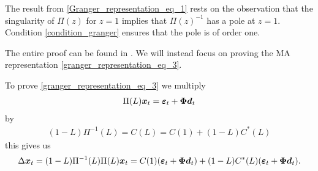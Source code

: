 \begin{bema}
    The result from \eqref{Granger_representation_eq_1} rests on the observation that the singularity of $\Pi(z)$ for $z=1$ implies that $\Pi(z)^{-1}$ has a pole at $z=1$. Condition \ref{condition_granger} ensures that the pole is of order one.
\end{bema}
\noindent The entire proof can be found in \cite{co-Integration_and_error_correction}. We will instead focus on proving the MA representation \eqref{granger_representation_eq_3}.
\begin{bevis}
    To prove \eqref{granger_representation_eq_3} we multiply 
    \begin{align*}
        \Pi(L)\boldsymbol{x}_t=\boldsymbol{\varepsilon}_t + \boldsymbol{\Phi} \boldsymbol{d}_t
    \end{align*}
    by
    \begin{align*}
        (1-L)\Pi^{-1}(L)=C(L)=C(1)+(1-L)C^\ast(L)
    \end{align*}
    this gives us
    \begin{align*}
        \Delta \boldsymbol{x}_t= (1-L)\Pi^{-1}(L)\Pi(L)\boldsymbol{x}_t=C(1)(\boldsymbol{\varepsilon}_t+\boldsymbol{\Phi} \boldsymbol{d}_t)+(1-L) C^\ast(L)(\boldsymbol{\varepsilon}_t+\boldsymbol{\Phi} \boldsymbol{d}_t).
    \end{align*}


\end{bevis}

